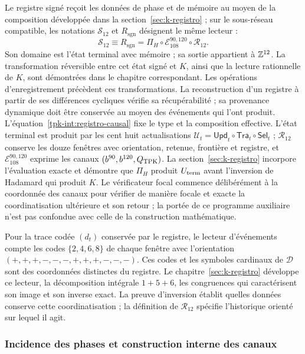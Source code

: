 Le registre signé reçoit les données de phase et de mémoire au moyen de la composition développée dans la section~\ref{sec:k-registro} ; sur le sous-réseau compatible, les notations \(\mathcal S_{12}\) et \(R_{\mathrm{sgn}}\) désignent le même lecteur :
\begin{equation}
 \mathcal S_{12}\equiv R_{\mathrm{sgn}}
 =\Pi_H\circ\mathcal E_{108}^{90,120}
                         \circ\mathcal R_{12}.
 \label{tpk-int:registro-causal}
\end{equation}
Son domaine est l'état terminal avec mémoire ; sa sortie appartient à \(\mathbb Z^{12}\). La transformation réversible entre cet état signé et \(K\), ainsi que la lecture rationnelle de \(K\), sont démontrées dans le chapitre correspondant. Les opérations d'enregistrement précèdent ces transformations. La reconstruction d'un registre à partir de ses différences cycliques vérifie sa récupérabilité ; sa provenance dynamique doit être conservée au moyen des événements qui l'ont produit. L'équation~\eqref{tpk-int:registro-causal} fixe le type et la composition effective. L'état terminal est produit par les cent huit actualisations \(\mathcal U_t=\mathsf{Upd}_t\circ\mathsf{Tra}_t\circ\mathsf{Sel}_t\) ; \(\mathcal R_{12}\) conserve les douze fenêtres avec orientation, retenue, frontière et registre, et \(\mathcal E_{108}^{90,120}\) exprime les canaux \((b^{90},b^{120},Q_{\rm TPK})\). La section~\ref{sec:k-registro} incorpore l'évaluation exacte et démontre que \(\Pi_H\) produit \(U_{\rm term}\) avant l'inversion de Hadamard qui produit \(K\). Le vérificateur focal commence délibérément à la coordonnée des canaux pour vérifier de manière focale et exacte la coordinatisation ultérieure et son retour ; la portée de ce programme auxiliaire n'est pas confondue avec celle de la construction mathématique.

Pour la trace codée \((d_t)\) conservée par le registre, le
lecteur d'événements compte les codes \(\{2,4,6,8\}\) de chaque
fenêtre avec l'orientation
\((+,+,+,-,-,-,+,+,+,-,-,-)\). Ces codes et les symboles
cardinaux de \(\mathcal D\) sont des coordonnées distinctes du
registre. Le chapitre~\ref{sec:k-registro} développe ce lecteur,
la décomposition intégrale \(1+5+6\), les congruences qui
caractérisent son image et son inverse exact. La preuve d'inversion
établit quelles données conserve cette coordinatisation ; la définition de
\(\mathcal R_{12}\) spécifie l'historique orienté sur lequel
il agit.

\subsubsection{Incidence des phases et construction interne des canaux}
\label{tpk-int:incidencia}

